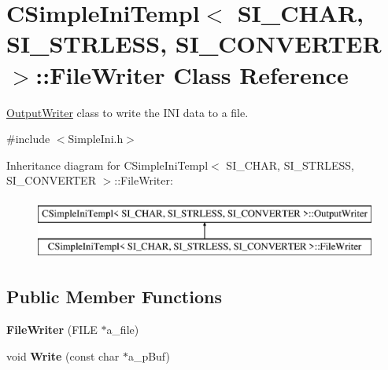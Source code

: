 \hypertarget{class_c_simple_ini_templ_1_1_file_writer}{}\section{C\+Simple\+Ini\+Templ$<$ S\+I\+\_\+\+C\+H\+AR, S\+I\+\_\+\+S\+T\+R\+L\+E\+SS, S\+I\+\_\+\+C\+O\+N\+V\+E\+R\+T\+ER $>$\+:\+:File\+Writer Class Reference}
\label{class_c_simple_ini_templ_1_1_file_writer}


\hyperlink{class_c_simple_ini_templ_1_1_output_writer}{Output\+Writer} class to write the I\+NI data to a file.  




{\ttfamily \#include $<$Simple\+Ini.\+h$>$}

Inheritance diagram for C\+Simple\+Ini\+Templ$<$ S\+I\+\_\+\+C\+H\+AR, S\+I\+\_\+\+S\+T\+R\+L\+E\+SS, S\+I\+\_\+\+C\+O\+N\+V\+E\+R\+T\+ER $>$\+:\+:File\+Writer\+:\begin{figure}[H]
\begin{center}
\leavevmode
\includegraphics[height=2.000000cm]{class_c_simple_ini_templ_1_1_file_writer}
\end{center}
\end{figure}
\subsection*{Public Member Functions}
\begin{DoxyCompactItemize}
\item 
{\bfseries File\+Writer} (F\+I\+LE $\ast$a\+\_\+file)\hypertarget{class_c_simple_ini_templ_1_1_file_writer_aecd4d79480c9b4e70b598c10014856f8}{}\label{class_c_simple_ini_templ_1_1_file_writer_aecd4d79480c9b4e70b598c10014856f8}

\item 
void {\bfseries Write} (const char $\ast$a\+\_\+p\+Buf)\hypertarget{class_c_simple_ini_templ_1_1_file_writer_ae8885b97884ef9dd5bf074bc4f011373}{}\label{class_c_simple_ini_templ_1_1_file_writer_ae8885b97884ef9dd5bf074bc4f011373}

\end{DoxyCompactItemize}


